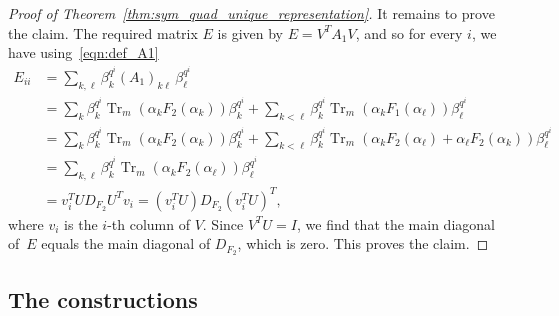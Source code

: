 \documentclass[10pt]{article}
\theoremstyle{definition}
\DeclareMathOperator{\Tr}{Tr}
\begin{document}
\begin{proof}[Proof of Theorem~\ref{thm:sym_quad_unique_representation}]
It remains to prove the claim. The required matrix $E$ is given by $E=V^TA_1V$, and so for every $i$, we have using~\eqref{eqn:def_A1}
\begin{align*}
E_{ii}&=\sum_{k,\ell}\beta_k^{q^i}(A_1)_{k\ell}\,\beta_\ell^{q^i}\\
&=\sum_k\beta_k^{q^i}\Tr_m(\alpha_kF_2(\alpha_k))\beta_k^{q^i}+\sum_{k<\ell}\beta_k^{q^i}\Tr_m(\alpha_kF_1(\alpha_\ell))\beta_\ell^{q^i}\\
&=\sum_k\beta_k^{q^i}\Tr_m(\alpha_kF_2(\alpha_k))\beta_k^{q^i}+\sum_{k<\ell}\beta_k^{q^i}\Tr_m(\alpha_kF_2(\alpha_\ell)+\alpha_\ell F_2(\alpha_k))\beta_\ell^{q^i}\\
%
&=\sum_{k,\ell}\beta_k^{q^i}\Tr_m(\alpha_kF_2(\alpha_\ell))\beta_\ell^{q^i}\\
&=v_i^TUD_{F_2}U^Tv_i=(v_i^TU)D_{F_2}(v_i^TU)^T,
\end{align*}
where $v_i$ is the $i$-th column of $V$. Since $V^TU=I$, we find that the main diagonal of~$E$ equals the main diagonal of $D_{F_2}$, which is zero. This proves the claim.
\end{proof}
\par

%

\subsection{The constructions}
\end{document}
